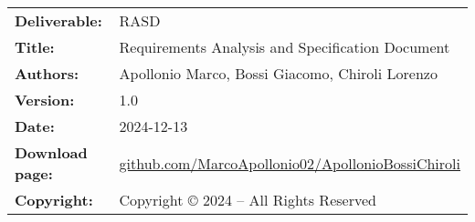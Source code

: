 \documentclass{Configuration_Files/PoliMi3i_thesis}
\begin{document}

\pagestyle{empty} %
\frontmatter %


\begin{table}[h!]
    \begin{tabu} to \textwidth { X[0.3,r,p] X[0.7,l,p] }
        \hline

        \textbf{Deliverable:}   & RASD                                                                                                                \\
        \textbf{Title:}         & Requirements Analysis and Specification Document                                                                    \\
        \textbf{Authors:}       & Apollonio Marco, Bossi Giacomo, Chiroli Lorenzo                                                                     \\
        \textbf{Version:}       & 1.0                                                                                                                 \\
        \textbf{Date:}          & 2024-12-13                                                                                                          \\
        \textbf{Download page:} & \href{https://github.com/MarcoApollonio02/ApollonioBossiChiroli}{github.com/MarcoApollonio02/ApollonioBossiChiroli} \\
        \textbf{Copyright:}     & Copyright © 2024 – All Rights Reserved                                                                              \\
        \hline
    \end{tabu}
\end{table}
\thispagestyle{empty} %
\end{document}
